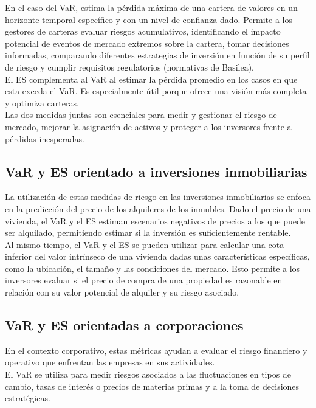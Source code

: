 \documentclass[11pt]{book}
\theoremstyle{plain} %
\theoremstyle{definition} %
\begin{document}
En el caso del VaR, estima la pérdida máxima de una cartera de valores 
en un horizonte temporal específico y con un nivel de confianza dado. 
Permite a los gestores de carteras evaluar riesgos acumulativos, 
identificando el impacto potencial de eventos de mercado extremos sobre 
la cartera, tomar decisiones informadas, comparando diferentes estrategias 
de inversión en función de su perfil de riesgo y cumplir requisitos 
regulatorios (normativas de Basilea).\\

El ES complementa al VaR al estimar la pérdida promedio en los casos en 
que esta exceda el VaR. Es especialmente útil porque ofrece una visión más 
completa y optimiza carteras.\\

Las dos medidas juntas son esenciales para medir y gestionar el riesgo de 
mercado, mejorar la asignación de activos y proteger a los inversores frente 
a pérdidas inesperadas.

\subsection{VaR y ES orientado a inversiones inmobiliarias}
La utilización de estas medidas de riesgo en las inversiones inmobiliarias 
se enfoca en la predicción del precio de los alquileres de los inmubles. 
Dado el precio de una vivienda, el VaR y el ES estiman escenarios negativos 
de precios a los que puede ser alquilado, permitiendo estimar 
si la inversión es suficientemente rentable.\\

Al mismo tiempo, el VaR y el ES se pueden utilizar para calcular una 
cota inferior del valor intrínseco de una vivienda dadas unas características
específicas, como la ubicación, el tamaño y las condiciones del mercado.
Esto permite a los inversores evaluar si el precio de compra de una propiedad
es razonable en relación con su valor potencial de alquiler y su riesgo asociado.\\


\subsection{VaR y ES orientadas a corporaciones}
En el contexto corporativo, estas métricas ayudan a evaluar el riesgo 
financiero y operativo que enfrentan las empresas en sus actividades.\\

El VaR se utiliza para medir riesgos asociados a las fluctuaciones en tipos de 
cambio, tasas de interés o precios de materias primas y a la toma de 
decisiones estratégicas.\\
\end{document}
